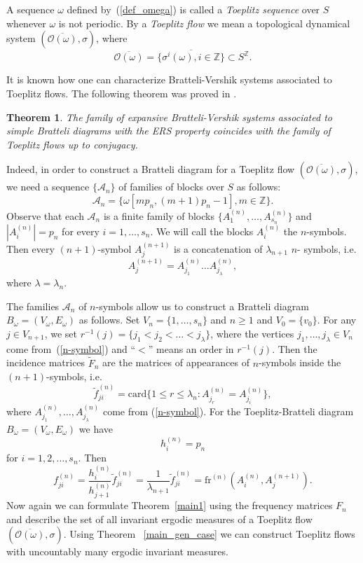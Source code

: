 \documentclass[11pt, english, reqno]{amsart}
\theoremstyle{definition}
\theoremstyle{remark}
\theoremstyle{plain}
\newtheorem{thm}[defin]{Theorem}
\def\ov{\overline}
\def\tl{\widetilde}
\numberwithin{equation}{section}
\begin{document}
{A sequence $\omega$ defined by~(\ref{def_omega}) is called a
 \textit{Toeplitz sequence }over $S$ whenever $\omega$ is not periodic.
 By a \textit{Toeplitz flow} we
mean a topological dynamical system $(\ov{\mathcal{O}(\omega)},
\sigma)$, where
$$
\ov{\mathcal{O}(\omega)} = \ov{\{\sigma^i(\omega), i \in \mathbb{Z}\}}
\subset S^{\mathbb{Z}}.
$$

 It is known how one can characterize Bratteli-Vershik systems associated to
  Toeplitz flows. The following theorem was proved  in  
  \cite{GjerdeJohansen2000}.
  
\begin{thm}
The family of expansive Bratteli-Vershik systems associated to simple Bratteli
diagrams with the ERS property coincides with the family of Toeplitz flows
up to conjugacy.
\end{thm}

Indeed, in order to construct a Bratteli diagram for a Toeplitz flow 
$(\ov{\mathcal{O}
(\omega)}, \sigma)$, we need a sequence $\{\mathcal{A}_n\}$ of families
of blocks over $S$ as follows:
$$
\mathcal{A}_n = \{\omega[mp_n, (m+1)p_n - 1], m \in \mathbb{Z}\}.
$$
Observe that each $\mathcal{A}_n$ is a finite family of blocks $\{A_1^{(n)},
\ldots, A_{s_n}^{(n)}\}$ and $|A_i^{(n)}| = p_n$ for every $i = 1,\ldots,
s_n$. We will call the blocks $A_i^{(n)}$ the $n$-symbols. Then every $(n
+1)$-symbol $A_j^{(n+1)}$ is a concatenation of $\lambda_{n+1}$ $n$-
symbols, i.e.
\begin{equation}\label{n-symbol}
A_j^{(n+1)} = A_{j_1}^{(n)}\ldots A_{j_{\lambda}}^{(n)},
\end{equation}
 where $\lambda = \lambda_n$.

The families $\mathcal{A}_n$ of $n$-symbols allow us to construct a Bratteli
diagram $B_{\omega} = (V_{\omega}, E_{\omega})$ as follows. Set $V_n =
\{1,\ldots,s_n\}$ and $n \geq 1$ and $V_0 = \{v_0\}$. For any $j \in V_{n
+1}$, we set $r^{-1}(j) = \{j_1 < j_2 < \ldots < j_{\lambda}\}$, where the
vertices $j_1, \ldots, j_{\lambda} \in V_n$ come from~(\ref{n-symbol}) and
``$<$'' means an order in $r^{-1}(j)$. Then the incidence matrices $\tl F_n$
are the matrices of appearances of $n$-symbols inside the $(n+1)$-symbols,
i.e.
$$
\tl f_{ji}^{(n)} = \mathrm{card}\{1 \leq r \leq \lambda_n: A_{j_r}^{(n)} =
A_{j_i}^{(n)}\},
$$
where $A^{(n)}_{j_1}, \ldots, A^{(n)}_{j_{\lambda}}$ come from
(\ref{n-symbol}). For the Toeplitz-Bratteli diagram $B_{\omega} = (V_{\omega},
E_{\omega})$ we have
$$
h_i^{(n)} = p_n
$$
for $i = 1,2,\ldots, s_n$. Then
$$
f_{ji}^{(n)} = \frac{h_i^{(n)}}{h_{j+1}^{(n)}} \tl f_{ji}^{(n)} = \frac{1}
{\lambda_{n+1}}\tl f_{ji}^{(n)} = \mathrm{fr}^{(n)}(A_i^{(n)}, A_j^{(n
+1)}).
$$
Now again we can formulate Theorem~\ref{main1} using the frequency
matrices $F_n$ and describe the set of all invariant ergodic measures of a
Toeplitz flow $(\ov{\mathcal{O}(\omega)}, \sigma)$.  Using Theorem~
\ref{main_gen_case} we can construct Toeplitz flows with uncountably many
ergodic invariant measures.


}
\end{document}
